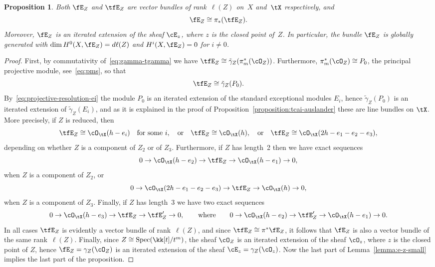 \documentclass[11pt]{amsart}
\DeclareMathOperator{\Spec}{\mathrm{Spec}}
\theoremstyle{plain}
\newtheorem{proposition}[theorem]{Proposition}
\theoremstyle{definition}
\theoremstyle{remark}
\begin{document}
\begin{proposition}
\label{proposition:e-z-big}
Both $\fE_Z$ and $\tfE_Z$ are vector bundles of rank~$\ell(Z)$ on~$X$ and~$\tX$ respectively, and
\begin{equation}
\label{eq:ez-pullback}
\fE_Z \cong \pi_*(\tfE_Z).
\end{equation}
Moreover, $\fE_Z$ is an iterated extension of the sheaf $\cE_z$, where $z$ is the closed point of~$Z$.
In particular, the bundle $\fE_Z$ is globally generated with $\dim H^0(X,\fE_Z) = d\ell(Z)$ and $H^i(X,\fE_Z) = 0$ for $i \ne 0$.
\end{proposition}
\begin{proof}
First, by commutativity of~\eqref{eq:gamma-tgamma} we have $\tfE_Z \cong \tilde\gamma_Z(\pi_m^*(\cO_Z))$.
Furthermore, $\pi_m^*(\cO_Z) \cong P_0$, the principal projective module, see~\eqref{eq:pms}, so that
\begin{equation}\label{eq:tcez-p0}
\tfE_Z \cong \tilde\gamma_Z(P_0).
\end{equation}
By~\eqref{eq:projective-resolution-ei} the module $P_0$ is an iterated extension of the standard exceptional modules $E_i$, 
hence $\tilde\gamma_Z(P_0)$ is an iterated extension of $\tilde\gamma_Z(E_i)$, 
and as it is explained in the proof of Proposition~\ref{proposition:tcai-auslander} these are line bundles on $\tX$.
More precisely, if $Z$ is reduced, then 
\begin{equation*}
\tfE_Z \cong \cO_\tX(h-e_i)\quad\text{for some $i$},\quad\text{or}\quad 
\tfE_Z \cong \cO_\tX(h),\quad\text{or}\quad
\tfE_Z \cong \cO_\tX(2h-e_1-e_2-e_3),
\end{equation*}
depending on whether $Z$ is a component of $Z_2$ or of $Z_3$.
Furthermore, if $Z$ has length~2 then we have exact sequences
\begin{equation}\label{eq:tcez-12}
0 \to \cO_\tX(h-e_2) \to \tfE_Z \to \cO_\tX(h-e_1) \to 0,
\end{equation}
when $Z$ is a component of $Z_2$, or
\begin{equation}\label{eq:tcez-123}
0 \to \cO_\tX(2h-e_1-e_2-e_3) \to \tfE_Z \to \cO_\tX(h) \to 0,
\end{equation}
when $Z$ is a component of $Z_3$.
Finally, if $Z$ has length~3 we have two exact sequences
\begin{equation}\label{eq:tcez-12-23}
0 \to \cO_\tX(h-e_3) \to \tfE_Z \to \tfE'_Z \to 0,
\qquad\text{where}\qquad
0 \to \cO_\tX(h-e_2) \to \tfE'_Z \to \cO_\tX(h-e_1) \to 0.
\end{equation}
In all cases $\tfE_Z$ is evidently a vector bundle of rank~$\ell(Z)$, 
and since $\tfE_Z \cong \pi^*\fE_Z$, it follows that $\fE_Z$ is also a vector bundle of the same rank~$\ell(Z)$.
Finally, since $Z \cong \Spec(\kk[t]/t^m)$, the sheaf $\cO_Z$ is an iterated extension of the sheaf $\cO_z$,
where $z$ is the closed point of $Z$, hence $\fE_Z = \gamma_Z(\cO_Z)$ is an iterated extension of the sheaf $\cE_z = \gamma_Z(\cO_z)$. 
Now the last part of Lemma~\ref{lemma:e-z-small} implies the last part of the proposition. 
\end{proof}
\end{document}

